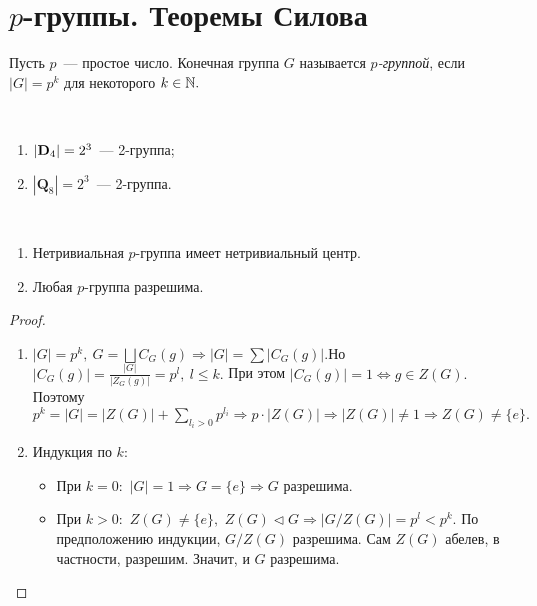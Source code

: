 \newpage
	\section{$p$-группы. Теоремы Силова}
	\setcounter{definition}{0}
        \begin{definition}
            Пусть $p$~--- простое число. Конечная группа $G$ называется \textit{$p$-группой}, если ${|G| = p^k}$ для некоторого ${k \in \mathbb{N}.}$
        \end{definition}
        \begin{exmpls}
            \
            \begin{enumerate}
            \setlength\itemsep{0.1em}
                \item ${|\mathbf{D}_4| = 2^3}$~--- 2-группа;
                \item ${|\mathbf{Q}_8| = 2^3}$~--- 2-группа.
            \end{enumerate}
        \end{exmpls}
        \begin{theorem}
            \
            \begin{enumerate}
            \setlength\itemsep{0.1em}
                \item Нетривиальная $p$-группа имеет нетривиальный центр. 
                \item Любая $p$-группа разрешима.
            \end{enumerate}
        \end{theorem}
        \begin{proof}
            \
            \begin{enumerate}
            \setlength\itemsep{0.1em}
                \item ${|G| = p^k, \ G = \bigsqcup C_G(g) \Rightarrow |G| = \displaystyle\sum|C_G(g)|.}$\newline Но ${|C_G(g)| = \frac{|G|}{|Z_G(g)|} = p^l, \ l \leqslant k.}$ При этом ${|C_G(g)| = 1 \Leftrightarrow g \in Z(G).}$ Поэтому ${p^k = |G| = |Z(G)| + \displaystyle\sum_{l_i > 0} p^{l_i} \Rightarrow p \cdot |Z(G)| \Rightarrow |Z(G)| \neq 1 \Rightarrow Z(G) \neq \{e\}.}$
                \item Индукция по $k$:
                \begin{itemize}
                \setlength\itemsep{0.1em}
                    \item При ${k = 0{:}}$ ${|G| = 1 \Rightarrow G = \{e\} \Rightarrow G}$ разрешима.
                    \item При ${k > 0{:}}$ ${Z(G) \neq \{e\},}$ ${Z(G) \lhd G \Rightarrow |G/Z(G)| = p^l < p^k.}$ По предположению
                    индукции, ${G/Z(G)}$ разрешима. Сам ${Z(G)}$ абелев, в частности, разрешим. Значит, и $G$ разрешима. \qedhere
                \end{itemize}
            \end{enumerate}
        \end{proof}
